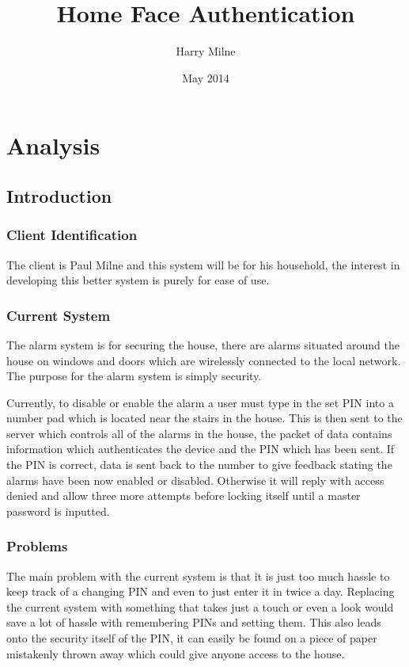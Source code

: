 \documentclass[12pt,a4paper]{report}
\title{Home Face Authentication}
\author{Harry Milne}
\date{May 2014}
\begin{document}
\maketitle
\tableofcontents

\chapter{Analysis}
\section{Introduction}\label{section:_Toc370402491}
\subsection{Client Identification}\label{section:_Toc370402492}
The client is Paul Milne and this system will be for his household, the 
interest in developing this better system is purely for ease of use.

\subsection{Current System}\label{section:_Toc370402493}
The alarm system is for securing the house, there are alarms situated 
around the house on windows and doors which are wirelessly connected to 
the local network. The purpose for the alarm system is simply security.

Currently, to disable or enable the alarm a user must type in the set 
PIN into a number pad which is located near the stairs in the house. 
This is then sent to the server which controls all of the alarms in the 
house, the packet of data contains information which authenticates the 
device and the PIN which has been sent. If the PIN is correct, data is 
sent back to the number to give feedback stating the alarms have been 
now enabled or disabled. Otherwise it will reply with access denied and 
allow three more attempts before locking itself until a master password 
is inputted. 

\subsection{Problems}\label{section:_Toc370402494}
The main problem with the current system is that it is just too much 
hassle to keep track of a changing PIN and even to just enter it in 
twice a day. Replacing the current system with something that takes just 
a touch or even a look would save a lot of hassle with remembering PINs 
and setting them. This also leads onto the security itself of the PIN, 
it can easily be found on a piece of paper mistakenly thrown away which 
could give anyone access to the house.
\end{document}
